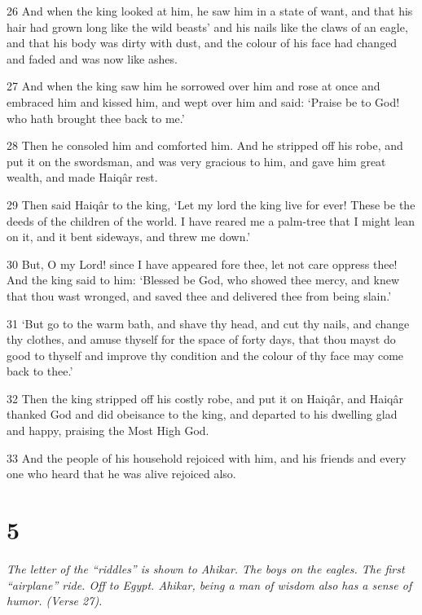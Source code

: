 \par 26 And when the king looked at him, he saw him in a state of want, and that his hair had grown long like the wild beasts' and his nails like the claws of an eagle, and that his body was dirty with dust, and the colour of his face had changed and faded and was now like ashes.

\par 27 And when the king saw him he sorrowed over him and rose at once and embraced him and kissed him, and wept over him and said: ‘Praise be to God! who hath brought thee back to me.’

\par 28 Then he consoled him and comforted him. And he stripped off his robe, and put it on the swordsman, and was very gracious to him, and gave him great wealth, and made Haiqâr rest.

\par 29 Then said Haiqâr to the king, ‘Let my lord the king live for ever! These be the deeds of the children of the world. I have reared me a palm-tree that I might lean on it, and it bent sideways, and threw me down.’

\par 30 But, O my Lord! since I have appeared fore thee, let not care oppress thee! And the king said to him: ‘Blessed be God, who showed thee mercy, and knew that thou wast wronged, and saved thee and delivered thee from being slain.’

\par 31 ‘But go to the warm bath, and shave thy head, and cut thy nails, and change thy clothes, and amuse thyself for the space of forty days, that thou mayst do good to thyself and improve thy condition and the colour of thy face may come back to thee.’

\par 32 Then the king stripped off his costly robe, and put it on Haiqâr, and Haiqâr thanked God and did obeisance to the king, and departed to his dwelling glad and happy, praising the Most High God.

\par 33 And the people of his household rejoiced with him, and his friends and every one who heard that he was alive rejoiced also.

\chapter{5}

\par \textit{The letter of the “riddles” is shown to Ahikar. The boys on the eagles. The first “airplane” ride. Off to Egypt. Ahikar, being a man of wisdom also has a sense of humor. (Verse 27).}

